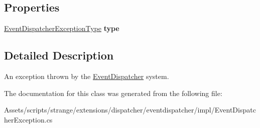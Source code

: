 \subsection*{Properties}
\begin{DoxyCompactItemize}
\item 
\hypertarget{classstrange_1_1extensions_1_1dispatcher_1_1eventdispatcher_1_1impl_1_1_event_dispatcher_exception_a9e589f2c5891b9838d7e9d5b6fe9600f}{\hyperlink{namespacestrange_1_1extensions_1_1dispatcher_1_1eventdispatcher_1_1api_ac82e4192fcc43ba5e64f0469a3c7c06d}{Event\-Dispatcher\-Exception\-Type} {\bfseries type}}\label{classstrange_1_1extensions_1_1dispatcher_1_1eventdispatcher_1_1impl_1_1_event_dispatcher_exception_a9e589f2c5891b9838d7e9d5b6fe9600f}

\end{DoxyCompactItemize}


\subsection{Detailed Description}
An exception thrown by the \hyperlink{classstrange_1_1extensions_1_1dispatcher_1_1eventdispatcher_1_1impl_1_1_event_dispatcher}{Event\-Dispatcher} system. 

The documentation for this class was generated from the following file\-:\begin{DoxyCompactItemize}
\item 
Assets/scripts/strange/extensions/dispatcher/eventdispatcher/impl/Event\-Dispatcher\-Exception.\-cs\end{DoxyCompactItemize}
